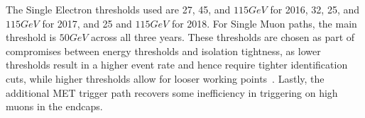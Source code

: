 %  

%  

%  

The Single Electron \pt thresholds used are 27, 45, and $115\unit{GeV}$ for 2016, 32, 25, and $115\unit{GeV}$ for 2017, and 25 and $115\unit{GeV}$ for 2018.
For Single Muon paths, the main threshold is $50\unit{GeV}$ across all three years.
These thresholds are chosen as part of compromises between energy thresholds and isolation tightness, as lower \pt thresholds result in a higher event rate and hence require tighter identification cuts, while higher \pt thresholds allow for looser working points~\cite{MuonPOG}.
Lastly, the additional MET trigger path recovers some inefficiency in triggering on high \pt muons in the endcaps.

